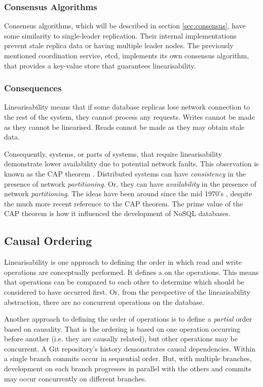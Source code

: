 \subsubsection{Consensus Algorithms}
Consensus algorithms, which will be described in section \ref{sec:consensus}, have some similarity to single-leader replication.
Their internal implementations prevent stale replica data or having multiple leader nodes.
The previously mentioned coordination service, etcd, implements its own consensus algorithm,
that provides a key-value store that guarantees linearisability.

\subsubsection{Consequences}
Linearisability means that if some database replicas lose network connection to the rest of the system,
they cannot process any requests.
Writes cannot be made as they cannot be linearised.
Reads connot be made as they may obtain stale data.

Consequently, systems, or parts of systems, that require linearisability demonstrate lower availability due to potential network faults.
This observation is known as the CAP theorem \cite{BrewerE2012Ctyl}.
Distributed systems can have \emph{consistency} in the presence of network \emph{partitioning}.
Or, they can have \emph{availability} in the presence of network \emph{partitioning}.
The ideas have been around since the mid 1970's \cite{rfc677}, despite the much more recent reference to the CAP theorem.
The prime value of the CAP theorem is how it influenced the development of NoSQL databases.

\subsection{Causal Ordering}\label{sec:causal-order}

Linearisability is one approach to defining the order in which read and write operations are conceptually performed.
It defines a  on the operations.
This means that operations can be compared to each other to determine which should be considered to have occurred first.
Or, from the perspective of the linearisability abstraction, there are no concurrent operations on the database.

Another approach to defining the order of operations is to define a \emph{partial} order based on causality.
That is the ordering is based on one operation occurring before another (i.e. they are causally related),
but other operations may be concurrent.
A Git repository's history demonstrates causal dependencies.
Within a single branch commits occur in sequential order.
But, with multiple branches, development on each branch progresses in parallel with the others
and commits may occur concurrently on different branches.

